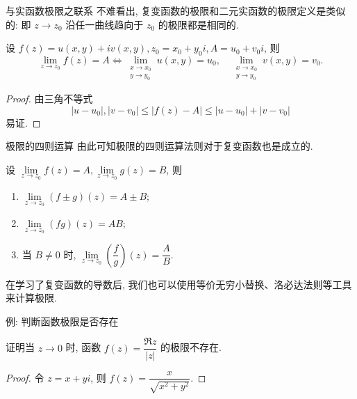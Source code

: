 \begin{frame}{与实函数极限之联系}
	\onslide<+->
	不难看出, 复变函数的极限和二元实函数的极限定义是类似的:
	\onslide<+->
	即 $z\to z_0$ 沿任一曲线趋向于 $z_0$ 的极限都是相同的.

	\onslide<+->
	\begin{theorem}
		设 $f(z)=u(x,y)+iv(x,y),z_0=x_0+y_0i,A=u_0+v_0i$, 则
		\[\lim_{z\to z_0}f(z)=A\iff
		\lim_{\substack{x\to x_0\\y\to y_0}}u(x,y)=u_0,\quad
		\lim_{\substack{x\to x_0\\y\to y_0}}v(x,y)=v_0.\]
	\end{theorem}

	\onslide<+->
	\begin{proof}
		由三角不等式
		\[|u-u_0|,|v-v_0|\le|f(z)-A|\le|u-u_0|+|v-v_0|\]
		易证.
	\end{proof}
\end{frame}


\begin{frame}{极限的四则运算}
	\onslide<+->
	由此可知极限的四则运算法则对于复变函数也是成立的.

	\onslide<+->
	\begin{theorem}
		设 $\lim\limits_{z\to z_0}f(z)=A,\lim\limits_{z\to z_0}g(z)=B$, 则
		\begin{enumerate}
			\item $\lim\limits_{z\to z_0}(f\pm g)(z)=A\pm B$;
			\item $\lim\limits_{z\to z_0}(fg)(z)=AB$;
			\item 当 $B\neq 0$ 时, $\lim\limits_{z\to z_0}\left(\dfrac fg\right)(z)=\dfrac AB$.
		\end{enumerate}
	\end{theorem}

	\onslide<+->
	在学习了复变函数的导数后, 我们也可以使用等价无穷小替换、洛必达法则等工具来计算极限.
\end{frame}


\begin{frame}{例: 判断函数极限是否存在}
	\onslide<+->
	\begin{example}
		证明当 $z\to0$ 时, 函数 $f(z)=\dfrac{\Re z}{|z|}$ 的极限不存在.
	\end{example}

	\onslide<+->
	\begin{proof}
		令 $z=x+yi$, 则 $f(z)=\dfrac x{\sqrt{x^2+y^2}}$.
		\onslide<+->{因此
			\[u(x,y)=\frac x{\sqrt{x^2+y^2}},\quad v(x,y)=0.\]}

	\end{proof}
\end{frame}


